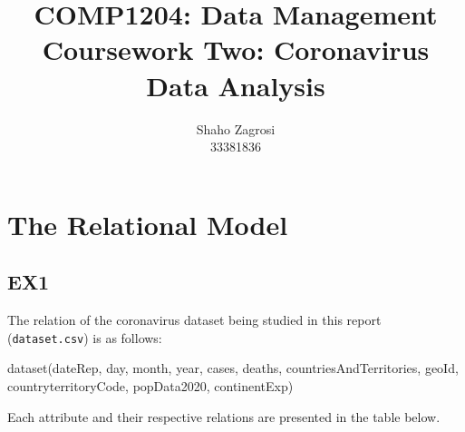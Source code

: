 \documentclass[]{article}
\title{COMP1204: Data Management \\ Coursework Two: Coronavirus Data Analysis}
\author{Shaho Zagrosi \\ 33381836}
\begin{document}
\maketitle

\tableofcontents

\newpage
\section{The Relational Model}
\subsection{EX1}
The relation of the coronavirus dataset being studied in this report (\verb|dataset.csv|) is as follows: \begin{ffcode}
dataset(dateRep, day, month, year, cases, deaths, countriesAndTerritories, geoId, countryterritoryCode, popData2020, continentExp)
\end{ffcode}
\noindent
Each attribute and their respective relations are presented in the table below.
\end{document}

